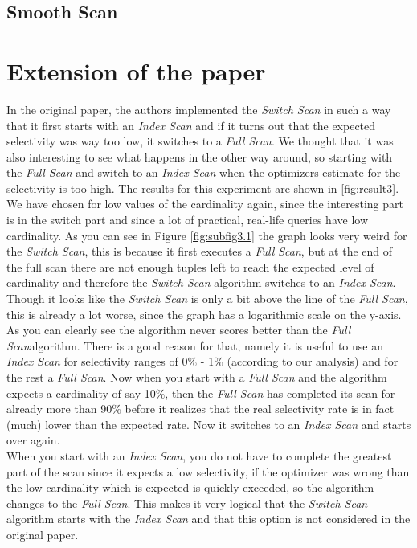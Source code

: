 \documentclass[a4paper,11pt,twoside]{article}
\begin{document}
\subsection{Smooth Scan}

\section{Extension of the paper}In the original paper, the authors implemented the \textit{Switch Scan} in such a way that it first starts with an \textit{Index Scan} and if it turns out that the expected selectivity was way too low, it switches to a \textit{Full Scan}. We thought that it was also interesting to see what happens in the other way around, so starting with the \textit{Full Scan} and switch to an \textit{Index Scan} when the optimizers estimate for the selectivity is too high. The results for this experiment are shown in \autoref{fig:result3}.\\
We have chosen for low values of the cardinality again, since the interesting part is in the switch part and since a lot of practical, real-life queries have low cardinality. As you can see in Figure \autoref{fig:subfig3.1} the graph looks very weird for the \textit{Switch Scan}, this is because it first executes a \textit{Full Scan}, but at the end of the full scan there are not enough tuples left to reach the expected level of cardinality and therefore the \textit{Switch Scan} algorithm switches to an \textit{Index Scan}. Though it looks like the \textit{Switch Scan} is only a bit above the line of the \textit{Full Scan}, this is already a lot worse, since the graph has a logarithmic scale on the y-axis. \\
As you can clearly see the algorithm never scores better than the \textit{Full Scan}algorithm. There is a good reason for that, namely it is useful to use an \textit{Index Scan} for selectivity ranges of 0$\%$ - 1$\%$ (according to our analysis) and for the rest a \textit{Full Scan}. Now when you start with a \textit{Full Scan} and the algorithm expects a cardinality of say 10$\%$, then the \textit{Full Scan} has completed its scan for already more than 90$\%$ before it realizes that the real selectivity rate is in fact (much) lower than the expected rate. Now it switches to an \textit{Index Scan} and starts over again. \\
When you start with an \textit{Index Scan}, you do not have to complete the greatest part of the scan since it expects a low selectivity, if the optimizer was wrong than the low cardinality which is expected is quickly exceeded, so the algorithm changes to the \textit{Full Scan}. This makes it very logical that the \textit{Switch Scan} algorithm starts with the \textit{Index Scan} and that this option is not considered in the original paper.
\end{document}

